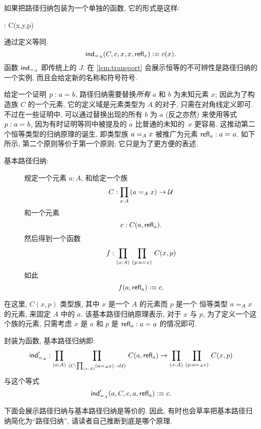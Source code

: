 如果把路径归纳包装为一个单独的函数, 它的形式是这样:
%
\begin{narrowmultline*}
     : 
     \to
    \narrowbreak
     C(x,y,p)
\end{narrowmultline*}
通过定义等同 \[ \indid{A}(C,c,x,x,\refl{x}) \defeq c(x). \]
函数 $ \indid{A}$ 即传统上的 $J$.
%
在 \cref{lem:transport} 会展示恒等的不可辨性是路径归纳的一个实例, 而且会给定新的名称和符号符号.

\mentalpause

给定一个证明 $p : \id{a}{b}$, 路径归纳需要替换\emph{所有} $a$ 和 $b$ 为未知元素 $x$;
因此为了构造族 $C$ 的一个元素, 它的定义域是元素类型为 $A$ 的对子, 只需在对角线定义即可.
不过在一些证明中, 可以通过替换出现的所有 $b$ 为 $a$ (反之亦然) 来使用等式 $p : \id{a}{b}$, 因为有时证明等同中被提及的 $a$ 比普通的未知的~$x$ 更容易.
这推动第二个恒等类型的归纳原理的诞生, 即类型族 $\id[A]{a}{x}$ 被推广为元素 $\refl{a} : \id{a}{a}$.
如下所示, 第二个原则等价于第一个原则;
它只是为了更方便的表述.

%
%
\begin{description}
    \item[基本路径归纳:]
    规定一个元素 $a:A$, 和给定一个族
    \[ C : \prd{x:A} (\id[A]{a}{x}) \to \UU \]
    和一个元素
    \[ c : C(a,\refl{a}). \]
    然后得到一个函数
    \[ f : \prd{x:A}{p:\id{a}{x}} C(x,p) \]
    如此
    \[ f(a,\refl{a}) \defeq c.\]
\end{description}

在这里, $C(x,p)$ 类型族,  其中 $x$ 是一个 $A$ 的元素而 $p$ 是一个 恒等类型 $\id[A]{a}{x}$ 的元素, 来固定 $A$ 中的 $a$.
该基本路径归纳原理表示, 对于 $x$ 与 $p$, 为了定义一个这个族的元素, 只需考虑 $x$ 是 $a$ 和 $p$ 是 $\refl{a} : \id{a}{a}$ 的情况即可.

封装为函数, 基本路径归纳即:
%
\begin{align*}
    \indidb{A} : \dprd{a:A}{C : \prd{x:A} (\id[A]{a}{x}) \to \UU}
    C(a,\refl{a}) \to \dprd{x:A}{p : \id[A]{a}{x}} C(x,p)
\end{align*}
与这个等式 \[ \indidb{A}(a,C,c,a,\refl{a}) \defeq c. \]

下面会展示路径归纳与基本路径归纳是等价的.
因此, 有时也会草率把基本路径归纳简化为``路径归纳'', 请读者自己推断到底是哪个原理.


